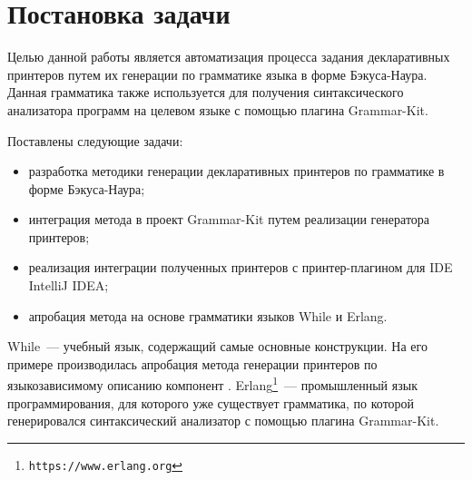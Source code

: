 \section{Постановка задачи}

Целью данной работы является автоматизация процесса задания декларативных принтеров путем их генерации по грамматике языка в форме Бэкуса-Наура.
Данная грамматика также используется для получения синтаксического анализатора программ на целевом языке с помощью плагина Grammar-Kit. 

Поставлены следующие задачи:
\begin{itemize}
    \item разработка методики генерации декларативных принтеров по грамматике в форме Бэкуса-Наура;
    \item интеграция метода в проект Grammar-Kit путем реализации генератора принтеров;
    \item реализация интеграции полученных принтеров с принтер-плагином для IDE IntelliJ IDEA;
    \item апробация метода на основе грамматики языков While \cite{paper:nielson} и Erlang.
\end{itemize}
While~--- учебный язык, содержащий самые основные конструкции.
На его примере производилась апробация метода генерации принтеров по языкозависимому описанию компонент \cite{paper:while}. 
Erlang\footnote{\texttt{https://www.erlang.org}}~--- промышленный язык программирования, для которого уже существует грамматика, по которой генерировался синтаксический анализатор с помощью плагина Grammar-Kit.

